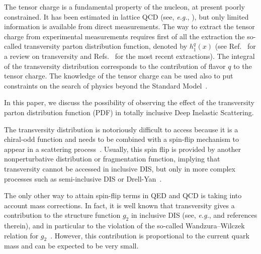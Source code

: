 \documentclass[preprintnumbers,floatfix,nofootinbib]{revtex4}
\newcommand{\eg}{{\em e.g.}}
\begin{document}
The tensor charge is a fundamental property of the nucleon, at
present poorly constrained. It has been estimated in lattice
QCD (see, \eg,
\cite{Green:2012ej,Bali:2014nma,Bhattacharya:2015wna,Abdel-Rehim:2015owa,Bhattacharya:2016zcn}), but
only limited information is available from direct measurements. The
way to extract the tensor charge from experimental measurements requires first
of all the extraction the so-called transversity parton distribution function,
denoted by $h_1^q(x)$ (see Ref.~\cite{Barone:2001sp} for a review on transversity and
Refs.~\cite{Radici:2015mwa,Anselmino:2015sxa,Kang:2015msa} for the most recent
extractions). 
The integral of the transversity distribution
corresponds to the contribution of flavor $q$ to the tensor charge.
The knowledge of the tensor charge can be used also to put constraints on the search of physics beyond the Standard
Model~\cite{Cirigliano:2013xha,Bhattacharya:2015esa,Courtoy:2015haa}.

In this paper, we discuss the possibility of observing the effect of
the transversity parton distribution function (PDF) in totally inclusive Deep Inelastic Scattering.

The transversity distribution is notoriously difficult to access because it is
a chiral-odd function and needs to be combined with a spin-flip mechanism to
appear in a scattering process~\cite{Jaffe:1996zw}. Usually, this spin flip is provided by another
nonperturbative distribution or fragmentation function, implying that
transversity cannot be accessed in inclusive DIS,
but only in more complex processes such as semi-inclusive DIS or Drell-Yan~\cite{Ralston:1979ys,Jaffe:1991kp,Jaffe:1993xb,Collins:1992kk}. 

The only other way to attain spin-flip terms in QED and QCD is taking into
account mass corrections. In fact, it is well known that transversity gives a
contribution to the structure function $g_2$ in inclusive DIS (see, \eg,
\cite{Accardi:2009au} and references therein), and in
particular to the violation of the so-called Wandzura--Wilczek relation for
$g_2$~\cite{Wandzura:1977qf}. However, this contribution is proportional to the current quark mass
and can be expected to be very small.
\end{document}
